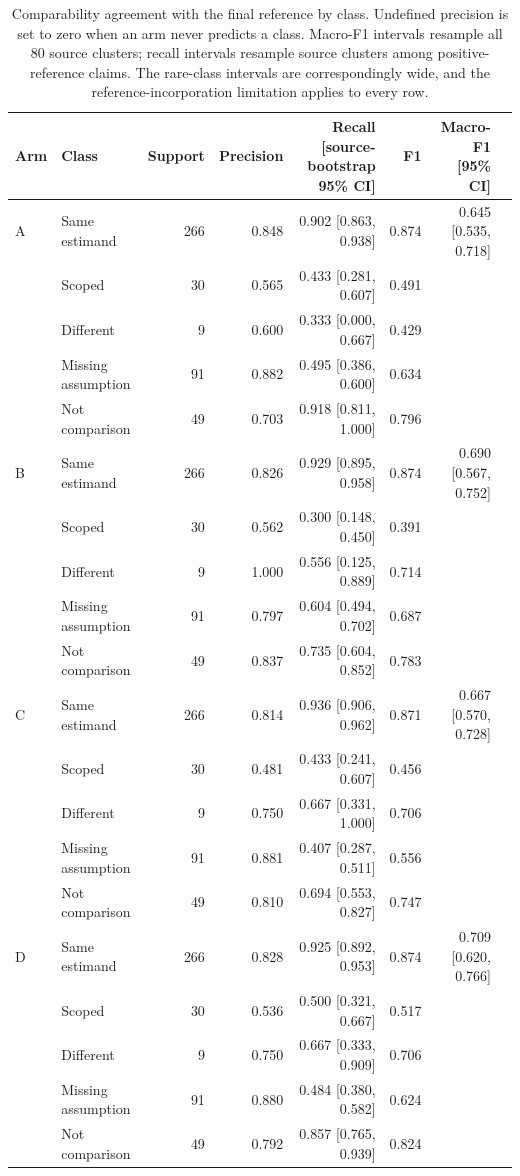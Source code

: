 \begin{table}[t]
\centering\scriptsize
\setlength{\tabcolsep}{3pt}
\begin{tabular}{llrrrrrr}
\toprule
Arm & Class & Support & Precision & Recall [source-bootstrap 95\% CI] & F1 & Macro-F1 [95\% CI] \\
\midrule
A & Same estimand & 266 & 0.848 & 0.902 [0.863, 0.938] & 0.874 & 0.645 [0.535, 0.718] \\
 & Scoped & 30 & 0.565 & 0.433 [0.281, 0.607] & 0.491 &  \\
 & Different & 9 & 0.600 & 0.333 [0.000, 0.667] & 0.429 &  \\
 & Missing assumption & 91 & 0.882 & 0.495 [0.386, 0.600] & 0.634 &  \\
 & Not comparison & 49 & 0.703 & 0.918 [0.811, 1.000] & 0.796 &  \\
\addlinespace
B & Same estimand & 266 & 0.826 & 0.929 [0.895, 0.958] & 0.874 & 0.690 [0.567, 0.752] \\
 & Scoped & 30 & 0.562 & 0.300 [0.148, 0.450] & 0.391 &  \\
 & Different & 9 & 1.000 & 0.556 [0.125, 0.889] & 0.714 &  \\
 & Missing assumption & 91 & 0.797 & 0.604 [0.494, 0.702] & 0.687 &  \\
 & Not comparison & 49 & 0.837 & 0.735 [0.604, 0.852] & 0.783 &  \\
\addlinespace
C & Same estimand & 266 & 0.814 & 0.936 [0.906, 0.962] & 0.871 & 0.667 [0.570, 0.728] \\
 & Scoped & 30 & 0.481 & 0.433 [0.241, 0.607] & 0.456 &  \\
 & Different & 9 & 0.750 & 0.667 [0.331, 1.000] & 0.706 &  \\
 & Missing assumption & 91 & 0.881 & 0.407 [0.287, 0.511] & 0.556 &  \\
 & Not comparison & 49 & 0.810 & 0.694 [0.553, 0.827] & 0.747 &  \\
\addlinespace
D & Same estimand & 266 & 0.828 & 0.925 [0.892, 0.953] & 0.874 & 0.709 [0.620, 0.766] \\
 & Scoped & 30 & 0.536 & 0.500 [0.321, 0.667] & 0.517 &  \\
 & Different & 9 & 0.750 & 0.667 [0.333, 0.909] & 0.706 &  \\
 & Missing assumption & 91 & 0.880 & 0.484 [0.380, 0.582] & 0.624 &  \\
 & Not comparison & 49 & 0.792 & 0.857 [0.765, 0.939] & 0.824 &  \\
\bottomrule
\end{tabular}
\caption{Comparability agreement with the final reference by class. Undefined precision is set to zero when an arm never predicts a class. Macro-F1 intervals resample all 80 source clusters; recall intervals resample source clusters among positive-reference claims. The rare-class intervals are correspondingly wide, and the reference-incorporation limitation applies to every row.}
\label{tab:v3-class-performance}
\end{table}

